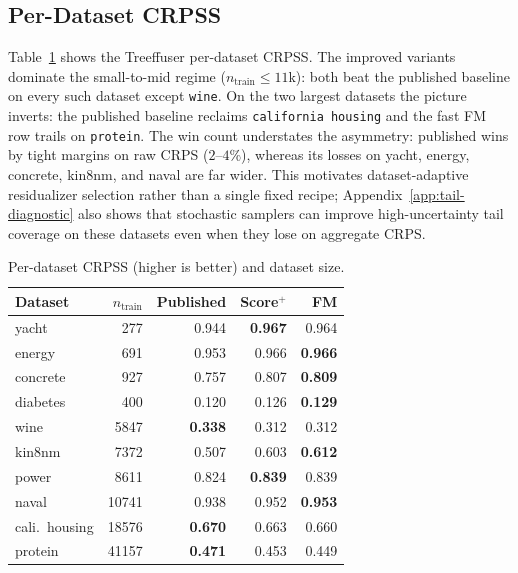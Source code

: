 \documentclass{uai2026}
\begin{document}
\subsection{Per-Dataset CRPSS}\label{sec:perdata}
Table~\ref{tab:per-dataset} shows the Treeffuser per-dataset CRPSS. The improved variants dominate the small-to-mid regime ($n_{\text{train}} \leq 11$k): both beat the published baseline on every such dataset except \texttt{wine}. On the two largest datasets the picture inverts: the published baseline reclaims \texttt{california\ housing} and the fast FM row trails on \texttt{protein}. The win count understates the asymmetry: published wins by tight margins on raw CRPS ($2$--$4\%$), whereas its losses on yacht, energy, concrete, kin8nm, and naval are far wider. This motivates dataset-adaptive residualizer selection rather than a single fixed recipe; Appendix~\ref{app:tail-diagnostic} also shows that stochastic samplers can improve high-uncertainty tail coverage on these datasets even when they lose on aggregate CRPS.

\begin{table}[!t]
  \centering
  \caption{Per-dataset CRPSS (higher is better) and dataset size.}\label{tab:per-dataset}
  \footnotesize
  \begin{tabular}{lrrrr}
    \toprule
    Dataset & $n_{\text{train}}$ & Published & Score$^+$ & FM \\
    \midrule
    yacht & 277 & 0.944 & \textbf{0.967} & 0.964 \\
    energy & 691 & 0.953 & 0.966 & \textbf{0.966} \\
    concrete & 927 & 0.757 & 0.807 & \textbf{0.809} \\
    diabetes & 400 & 0.120 & 0.126 & \textbf{0.129} \\
    wine & 5847 & \textbf{0.338} & 0.312 & 0.312 \\
    kin8nm & 7372 & 0.507 & 0.603 & \textbf{0.612} \\
    power & 8611 & 0.824 & \textbf{0.839} & 0.839 \\
    naval & 10741 & 0.938 & 0.952 & \textbf{0.953} \\
    cali.\ housing & 18576 & \textbf{0.670} & 0.663 & 0.660 \\
    protein & 41157 & \textbf{0.471} & 0.453 & 0.449 \\
    \bottomrule
  \end{tabular}
\end{table}
\end{document}
